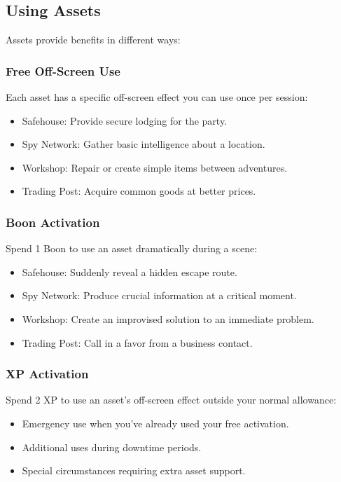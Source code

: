 \documentclass[11pt,twoside,openany]{book}
\begin{document}
\subsection*{Using Assets}

Assets provide benefits in different ways:

\subsubsection*{Free Off-Screen Use}

Each asset has a specific off-screen effect you can use once per session:
\begin{itemize}
\item Safehouse: Provide secure lodging for the party.
\item Spy Network: Gather basic intelligence about a location.
\item Workshop: Repair or create simple items between adventures.
\item Trading Post: Acquire common goods at better prices.
\end{itemize}

\subsubsection*{Boon Activation}

Spend 1 Boon to use an asset dramatically during a scene:
\begin{itemize}
\item Safehouse: Suddenly reveal a hidden escape route.
\item Spy Network: Produce crucial information at a critical moment.
\item Workshop: Create an improvised solution to an immediate problem.
\item Trading Post: Call in a favor from a business contact.
\end{itemize}

\subsubsection*{XP Activation}

Spend 2 XP to use an asset's off-screen effect outside your normal allowance:
\begin{itemize}
\item Emergency use when you've already used your free activation.
\item Additional uses during downtime periods.
\item Special circumstances requiring extra asset support.
\end{itemize}
\end{document}
